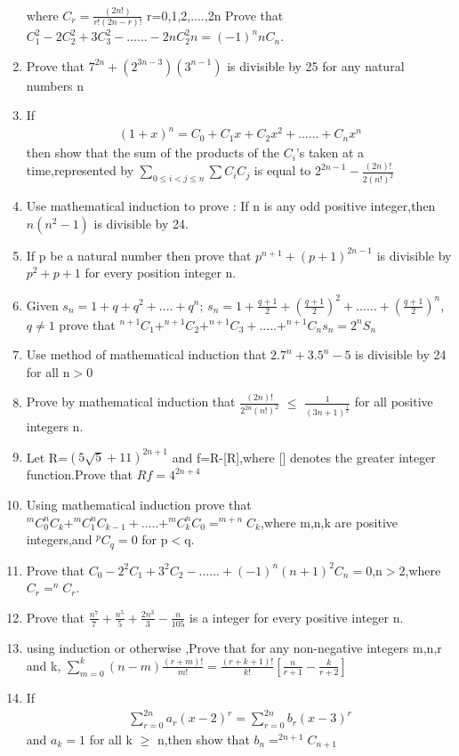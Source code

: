 \begin{enumerate}[label=\arabic*.,ref=\thesubsection.\theenumi]
\begin{align}
\end{align} where $C_r=\frac{(2n!)}{r!(2n-r)!}$  r=0,1,2,....,2n Prove that $C^2_1-2C^2_2+3C^2_3-......-2nC^2_2n=(-1)^{n}nC_n$.
\item Prove that $7^{2n}+(2^{3n-3})(3^{n-1})$ is divisible by 25 for any natural numbers n
\item If 
\begin{align}
(1+x)^n=C_0+C_1x+C_2x^2+......+C_nx^n
\end{align} then show that the sum of the products of the $C_i$'s taken at a time,represented by $\sum_{0\leq i<j \leq n}\sum C_i C_j$ is equal to $2^{2n-1}-\frac{(2n)!}{2(n!)^2}$
\item Use mathematical induction to prove : If n is any odd positive integer,then $n(n^2-1)$ is divisible by 24.
\item If p be a natural number then prove that $p^{n+1}+(p+1)^{2n-1}$ is divisible by $p^2+p+1$ for every position integer n.
\item Given $s_n=1+q+q^2+....+q^n$;
$s_n=1+\frac{q+1}{2}+(\frac{q+1}{2})^2+......+(\frac{q+1}{2})^n$, $q\neq 1$
prove that $^{n+1}C_1+^{n+1}C_2+ ^{n+1}C_3+.....+^{n+1}C_n s_n=2^n S_n$
\item Use method of mathematical induction that $2.7^n+3.5^n-5$ is divisible by 24 for all n$>$0
\item Prove by mathematical induction that $\frac{(2n)!}{2^{2n}(n!)^2}$ $\leq$ $\frac{1}{(3n+1)^\frac{1}{2}}$ for all positive integers n.
\item Let R=$(5\sqrt{5}+11)^{2n+1}$ and f=R-[R],where [] denotes the greater integer function.Prove that $Rf=4^{2n+4}$
\item Using mathematical induction prove that $^{m} C_0  ^{n} C_k+ ^{m} C_1  ^{n} C_{k-1}+.....+ ^{m} C_k  ^{n}C_0= ^{m+n} C_k$,where m,n,k are positive integers,and $^{p}C_q=0$ for p$<$q.
\item Prove that $C_0-2^2C_1+3^2C_2-......+(-1)^n (n+1)^2 C_n=0$,n$>$2,where $C_r=^{n}C_r$.
\item Prove that $\frac{n^7}{7}+\frac{n^5}{5}+\frac{2n^3}{3}-\frac{n}{105}$ is a integer for every positive integer n.
\item using induction or otherwise ,Prove that for any non-negative integers m,n,r and k,
$\sum_{m=0}^{k} (n-m)\frac{(r+m)!}{m!}=\frac{(r+k+1)!}{k!}[\frac{n}{r+1}-\frac{k}{r+2}]$
\item If 
\begin{align}
\sum_{r=0}^{2n}a_r(x-2)^r=\sum_{r=0}^{2n}b_r(x-3)^r
\end{align} and $a_k=1$ for all k $\geq$ n,then show that $b_n= ^{2n+1}C_{n+1}$

\end{enumerate}
